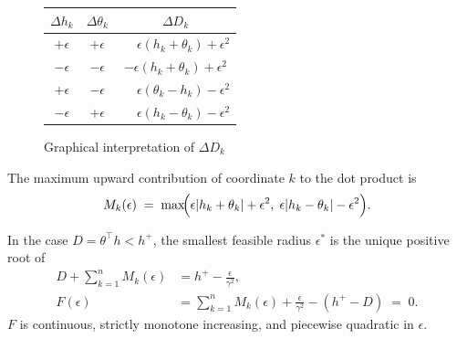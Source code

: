 \documentclass{article}
\begin{document}
\begin{figure}[htbp]
    \centering
    \begin{minipage}{0.4\textwidth}

    

        \renewcommand{\arraystretch}{1.35}
        \begin{tabular}{ccc}
        \hline
        $\Delta h_k$ & $\Delta \theta_{k}$ & $\Delta D_k$ \\
        \hline
        $+\epsilon$ & $+\epsilon$ & $\phantom{-}\epsilon(h_k+\theta_{k})+\epsilon^2$ \\
        $-\epsilon$ & $-\epsilon$ & $-\epsilon(h_k+\theta_{k})+\epsilon^2$ \\
        \hline
        $+\epsilon$ & $-\epsilon$ & $\phantom{-}\epsilon(\theta_{k}-h_k)-\epsilon^2$ \\
        $-\epsilon$ & $+\epsilon$ & $\phantom{-}\epsilon(h_k-\theta_{k})-\epsilon^2$ \\
        \hline
        \end{tabular}
    \end{minipage}\hfill
    \begin{minipage}{0.6\textwidth}
        \centering
        
        \vspace{-1.0pt}
        \caption{Graphical interpretation of $\Delta D_k$}
    \end{minipage}
\end{figure}
The maximum upward contribution of coordinate $k$ to the dot product is
\begin{equation}
\label{eq:bilinf-Mk}
  M_k(\epsilon)
    \;=\; \max\!\Bigl(
      \epsilon|h_k+\theta_{k}|+\epsilon^2,\;
      \epsilon|h_k-\theta_{k}|-\epsilon^2
    \Bigr).
\end{equation}

In the case $D=\theta^\top h < h^{+}$, the smallest feasible radius $\epsilon^*$ is
the unique positive root of
\begin{equation}
\label{eq:bilinf-root}
\begin{aligned}
    D+\sum_{k=1}^{n} M_k(\epsilon)
      &= h^{+}  - \frac{\epsilon}{\gamma^2}, \\
    F(\epsilon)
      &= \sum_{k=1}^{n} M_k(\epsilon) + \frac{\epsilon}{\gamma^2} - (h^{+} - D)
      \;=\; 0.
\end{aligned}
\end{equation}
$F$ is continuous, strictly monotone increasing, and piecewise quadratic
in $\epsilon$.
\end{document}
